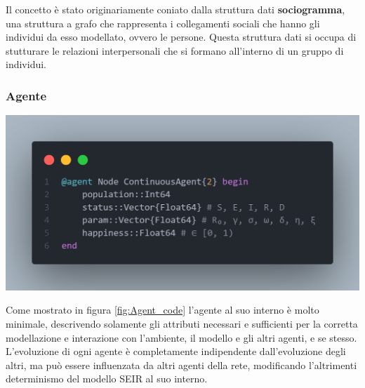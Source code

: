 Il concetto è stato originariamente coniato dalla struttura dati \textbf{sociogramma}, 
una struttura a grafo che rappresenta i collegamenti sociali che hanno gli individui da esso modellato, ovvero le persone. 
Questa struttura dati si occupa di stutturare le relazioni interpersonali che si formano all'interno di un 
gruppo di individui. 

\subsubsection{Agente}

\begin{minipage}{\linewidth}
    \centering
    \includegraphics[width=\textwidth]{img/node_agent.png}
    \label{fig:Agent_code}
\end{minipage}

Come mostrato in figura \ref{fig:Agent_code} l'agente al suo interno è molto minimale,
descrivendo solamente gli attributi necessari e sufficienti per la corretta modellazione
e interazione con l'ambiente, il modello e gli altri agenti, e se stesso. L'evoluzione di 
ogni agente è completamente indipendente dall'evoluzione degli altri, ma può essere influenzata da 
altri agenti della rete, modificando l'altrimenti determinismo del modello SEIR al suo interno. 

